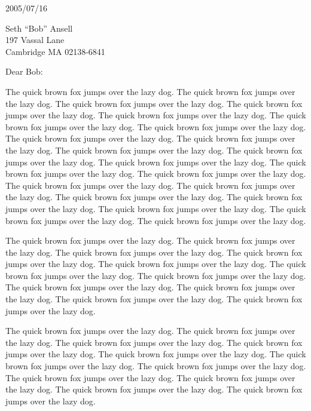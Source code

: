 \documentclass[11pt]{article}%
\def\docdate{2005/07/16}%
\numberwithin{equation}{section}%
\begin{document}
\thispagestyle{first}


\docdate

 Seth ``Bob'' Ansell \\
 197 Vassal Lane \\
 Cambridge MA 02138-6841

Dear Bob:

\begin{multicols}{2}

The quick brown fox jumps over the lazy dog. The quick brown fox
jumps over the lazy dog. The quick brown fox jumps over the lazy
dog. The quick brown fox jumps over the lazy dog. The quick brown
fox jumps over the lazy dog. The quick brown fox jumps over the lazy
dog. The quick brown fox jumps over the lazy dog. The quick brown
fox jumps over the lazy dog. The quick brown fox jumps over the lazy
dog. The quick brown fox jumps over the lazy dog. The quick brown
fox jumps over the lazy dog. The quick brown fox jumps over the lazy
dog. The quick brown fox jumps over the lazy dog. The quick brown
fox jumps over the lazy dog. The quick brown fox jumps over the lazy
dog. The quick brown fox jumps over the lazy dog. The quick brown
fox jumps over the lazy dog. The quick brown fox jumps over the lazy
dog. The quick brown fox jumps over the lazy dog. The quick brown
fox jumps over the lazy dog. The quick brown fox jumps over the lazy
dog.

The quick brown fox jumps over the lazy dog. The quick brown fox
jumps over the lazy dog. The quick brown fox jumps over the lazy
dog. The quick brown fox jumps over the lazy dog. The quick brown
fox jumps over the lazy dog. The quick brown fox jumps over the lazy
dog. The quick brown fox jumps over the lazy dog. The quick brown
fox jumps over the lazy dog. The quick brown fox jumps over the lazy
dog. The quick brown fox jumps over the lazy dog. The quick brown
fox jumps over the lazy dog.

The quick brown fox jumps over the lazy dog. The quick brown fox
jumps over the lazy dog. The quick brown fox jumps over the lazy
dog. The quick brown fox jumps over the lazy dog. The quick brown
fox jumps over the lazy dog. The quick brown fox jumps over the lazy
dog. The quick brown fox jumps over the lazy dog. The quick brown
fox jumps over the lazy dog. The quick brown fox jumps over the lazy
dog. The quick brown fox jumps over the lazy dog. The quick brown
fox jumps over the lazy dog.


\end{multicols}
\end{document}

